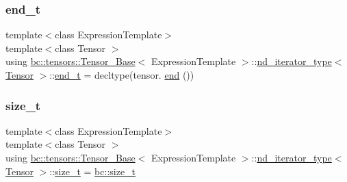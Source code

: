 \mbox{\label{structbc_1_1tensors_1_1Tensor__Base_1_1nd__iterator__type_a3c6a8833df7b94e13446d929cd57e257}} 
\subsubsection{\texorpdfstring{end\+\_\+t}{end\_t}}
{\footnotesize\ttfamily template$<$class Expression\+Template$>$ \\
template$<$class Tensor $>$ \\
using \hyperlink{classbc_1_1tensors_1_1Tensor__Base}{bc\+::tensors\+::\+Tensor\+\_\+\+Base}$<$ Expression\+Template $>$\+::\hyperlink{structbc_1_1tensors_1_1Tensor__Base_1_1nd__iterator__type}{nd\+\_\+iterator\+\_\+type}$<$ \hyperlink{namespacebc_a659391e47ab612be3ba6c18cf9c89159}{Tensor} $>$\+::\hyperlink{structbc_1_1tensors_1_1Tensor__Base_1_1nd__iterator__type_a3c6a8833df7b94e13446d929cd57e257}{end\+\_\+t} =  decltype(tensor. \hyperlink{structbc_1_1tensors_1_1Tensor__Base_1_1nd__iterator__type_aa4eda31e9f2052dc1c555a5cd1e9b2bc}{end} ())}

\mbox{\label{structbc_1_1tensors_1_1Tensor__Base_1_1nd__iterator__type_a61b9b5bad77746684cc457b24b2cc202}} 
\subsubsection{\texorpdfstring{size\+\_\+t}{size\_t}}
{\footnotesize\ttfamily template$<$class Expression\+Template$>$ \\
template$<$class Tensor $>$ \\
using \hyperlink{classbc_1_1tensors_1_1Tensor__Base}{bc\+::tensors\+::\+Tensor\+\_\+\+Base}$<$ Expression\+Template $>$\+::\hyperlink{structbc_1_1tensors_1_1Tensor__Base_1_1nd__iterator__type}{nd\+\_\+iterator\+\_\+type}$<$ \hyperlink{namespacebc_a659391e47ab612be3ba6c18cf9c89159}{Tensor} $>$\+::\hyperlink{structbc_1_1tensors_1_1Tensor__Base_1_1nd__iterator__type_a61b9b5bad77746684cc457b24b2cc202}{size\+\_\+t} =  \hyperlink{namespacebc_aaf8e3fbf99b04b1b57c4f80c6f55d3c5}{bc\+::size\+\_\+t}}



